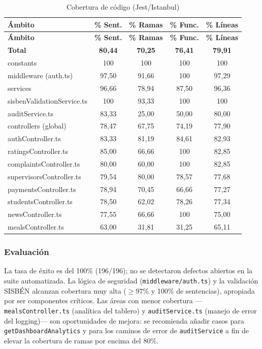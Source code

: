 \documentclass[stu,11pt,floatsintext]{apa7}
\begin{document}
\begin{longtable}{L{0.40\textwidth} c c c c}
\caption{Cobertura de código (Jest/Istanbul)}\label{tab:cobertura}\\
\toprule
\textbf{Ámbito} & \textbf{\% Sent.} & \textbf{\% Ramas} & \textbf{\% Func.} & \textbf{\% Líneas} \\
\midrule
\endfirsthead
\toprule
\textbf{Ámbito} & \textbf{\% Sent.} & \textbf{\% Ramas} & \textbf{\% Func.} & \textbf{\% Líneas} \\
\midrule
\endhead
\bottomrule
\endlastfoot
\textbf{Total} & \textbf{80,44} & \textbf{70,25} & \textbf{76,41} & \textbf{79,91} \\
constants & 100 & 100 & 100 & 100 \\
middleware (auth.ts) & 97,50 & 91,66 & 100 & 97,29 \\
services & 96,66 & 78,94 & 87,50 & 96,36 \\
\quad sisbenValidationService.ts & 100 & 93,33 & 100 & 100 \\
\quad auditService.ts & 83,33 & 25,00 & 50,00 & 80,00 \\
controllers (global) & 78,47 & 67,75 & 74,19 & 77,90 \\
\quad authController.ts & 83,33 & 81,19 & 84,61 & 82,93 \\
\quad ratingsController.ts & 85,00 & 66,66 & 100 & 82,85 \\
\quad complaintsController.ts & 80,00 & 60,00 & 100 & 82,85 \\
\quad supervisorsController.ts & 79,54 & 80,00 & 78,57 & 77,68 \\
\quad paymentsController.ts & 78,94 & 70,45 & 66,66 & 77,27 \\
\quad studentsController.ts & 78,50 & 62,02 & 78,26 & 77,34 \\
\quad newsController.ts & 77,55 & 66,66 & 100 & 75,00 \\
\quad mealsController.ts & 63,00 & 31,81 & 31,25 & 65,11 \\
\end{longtable}

\subsubsection{Evaluación}
La tasa de éxito es del 100\% (196/196); no se detectaron defectos abiertos en la suite
automatizada. La lógica de seguridad (\texttt{middleware/auth.ts}) y la validación SISBÉN
alcanzan cobertura muy alta ($\geq 97\%$ y 100\% de sentencias), apropiada por ser
componentes críticos. Las áreas con menor cobertura —\texttt{mealsController.ts}
(analítica del tablero) y \texttt{auditService.ts} (manejo de error del logging)— son
oportunidades de mejora: se recomienda añadir casos para \texttt{getDashboardAnalytics} y
para los caminos de error de \texttt{auditService} a fin de elevar la cobertura de ramas
por encima del 80\%.
\end{document}
